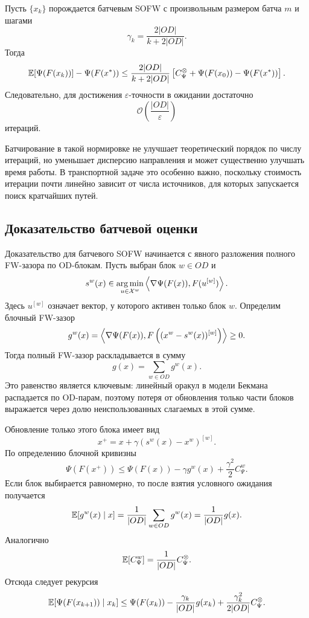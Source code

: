\begin{theorem}
\label{thm:sofw-batched-rate}
Пусть $\{x_k\}$ порождается батчевым SOFW с произвольным размером батча $m$ и шагами
\[
    \gamma_k=\frac{2|OD|}{k+2|OD|}.
\]
Тогда
\[
    \mathbb{E}[\Psi(F(x_k))]-\Psi(F(x^\ast))
    \leq
    \frac{2|OD|}{k+2|OD|}
    \left[
        C_\Psi^\otimes+\Psi(F(x_0))-\Psi(F(x^\ast))
    \right].
\]
Следовательно, для достижения $\varepsilon$-точности в ожидании достаточно
\[
    \mathcal{O}\left(\frac{|OD|}{\varepsilon}\right)
\]
итераций.
\end{theorem}

Батчирование в такой нормировке не улучшает теоретический порядок по числу итераций, но уменьшает дисперсию направления и может существенно улучшать время работы.
В транспортной задаче это особенно важно, поскольку стоимость итерации почти линейно зависит от числа источников, для которых запускается поиск кратчайших путей.

\subsection{Доказательство батчевой оценки}

Доказательство для батчевого SOFW начинается с явного разложения полного FW-зазора по
OD-блокам.
Пусть выбран блок $w\in OD$ и
\[
    s^w(x)\in
    \operatorname*{arg\,min}_{u\in\mathcal{X}^w}
    \left\langle \nabla\Psi(F(x)), F(u^{[w]}) \right\rangle.
\]
Здесь $u^{[w]}$ означает вектор, у которого активен только блок $w$.
Определим блочный FW-зазор
\[
    g^w(x)
    =
    \left\langle \nabla\Psi(F(x)), F\left((x^w-s^w(x))^{[w]}\right) \right\rangle
    \geq 0.
\]
Тогда полный FW-зазор раскладывается в сумму
\[
    g(x)
    =
    \sum_{w\in OD}g^w(x).
\]
Это равенство является ключевым: линейный оракул в модели Бекмана распадается по
OD-парам, поэтому потеря от обновления только части блоков выражается через долю
неиспользованных слагаемых в этой сумме.

Обновление только этого блока имеет вид
\[
    x^+=x+\gamma(s^w(x)-x^w)^{[w]}.
\]
По определению блочной кривизны
\[
    \Psi(F(x^+))
    \leq
    \Psi(F(x))
    -
    \gamma g^w(x)
    +
    \frac{\gamma^2}{2}C_\Psi^w.
\]
Если блок выбирается равномерно, то после взятия условного ожидания получается
\[
    \mathbb{E}[g^w(x)\mid x]
    =
    \frac{1}{|OD|}\sum_{w\in OD}g^w(x)
    =
    \frac{1}{|OD|}g(x).
\]
Аналогично
\[
    \mathbb{E}[C_\Psi^w]=\frac{1}{|OD|}C_\Psi^\otimes.
\]
Отсюда следует рекурсия
\[
    \mathbb{E}[\Psi(F(x_{k+1}))\mid x_k]
    \leq
    \Psi(F(x_k))
    -
    \frac{\gamma_k}{|OD|}g(x_k)
    +
    \frac{\gamma_k^2}{2|OD|}C_\Psi^\otimes.
\]

